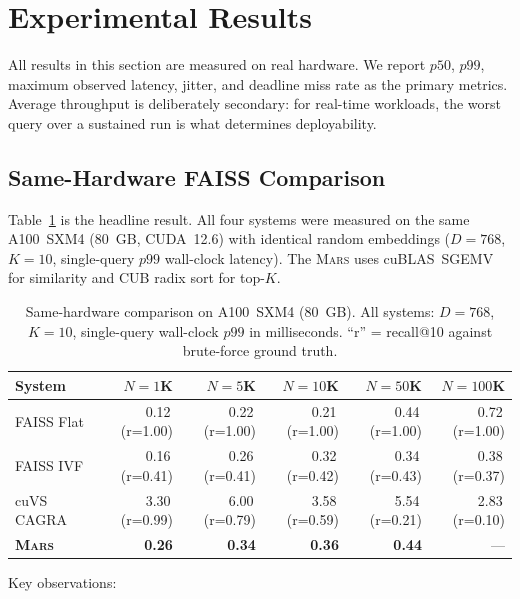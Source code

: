\documentclass[11pt]{article}
\newcommand{\mars}{\textsc{Mars}}
\begin{document}
\section{Experimental Results}
\label{sec:results}

All results in this section are measured on real hardware. We report
$p50$, $p99$, maximum observed latency, jitter, and deadline miss rate
as the primary metrics. Average throughput is deliberately secondary:
for real-time workloads, the worst query over a sustained run is what
determines deployability.

\subsection{Same-Hardware FAISS Comparison}
\label{sec:comparison}

Table~\ref{tab:faiss_comparison} is the headline result. All four
systems were measured on the same A100~SXM4 (80~GB, CUDA~12.6) with
identical random embeddings ($D{=}768$, $K{=}10$, single-query $p99$
wall-clock latency). The \mars{} uses cuBLAS~SGEMV for
similarity and CUB radix sort for top-$K$.

\begin{table}[ht]
\centering
\small
\caption{Same-hardware comparison on A100~SXM4 (80~GB). All systems:
$D{=}768$, $K{=}10$, single-query wall-clock $p99$ in milliseconds.
``r'' = recall@10 against brute-force ground truth.}
\label{tab:faiss_comparison}
\begin{tabular}{lrrrrr}
\toprule
\textbf{System} & \textbf{$N{=}1$K} & \textbf{$N{=}5$K} & \textbf{$N{=}10$K} & \textbf{$N{=}50$K} & \textbf{$N{=}100$K} \\
\midrule
FAISS Flat  & 0.12\,(r=1.00) & 0.22\,(r=1.00) & 0.21\,(r=1.00) & 0.44\,(r=1.00) & 0.72\,(r=1.00) \\
FAISS IVF   & 0.16\,(r=0.41) & 0.26\,(r=0.41) & 0.32\,(r=0.42) & 0.34\,(r=0.43) & 0.38\,(r=0.37) \\
cuVS CAGRA  & 3.30\,(r=0.99) & 6.00\,(r=0.79) & 3.58\,(r=0.59) & 5.54\,(r=0.21) & 2.83\,(r=0.10) \\
\textbf{\mars{}} & \textbf{0.26} & \textbf{0.34} & \textbf{0.36} & \textbf{0.44} & --- \\
\bottomrule
\end{tabular}
\end{table}

\noindent Key observations:
\end{document}
